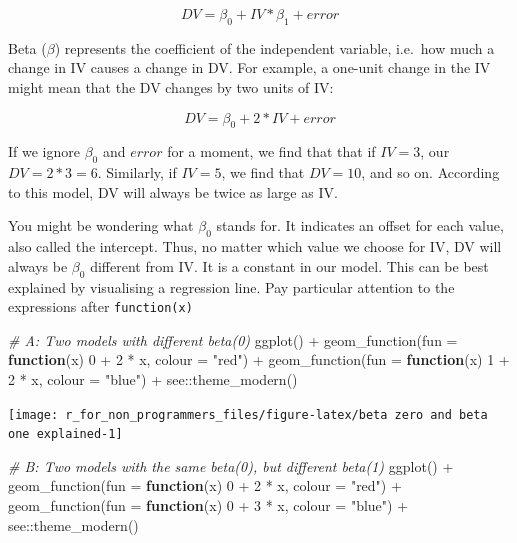 \documentclass[
]{book}
\newenvironment{Shaded}{\begin{snugshade}}{\end{snugshade}}
\newcommand{\AttributeTok}[1]{\textcolor[rgb]{0.77,0.63,0.00}{#1}}
\newcommand{\CommentTok}[1]{\textcolor[rgb]{0.56,0.35,0.01}{\textit{#1}}}
\newcommand{\ControlFlowTok}[1]{\textcolor[rgb]{0.13,0.29,0.53}{\textbf{#1}}}
\newcommand{\DecValTok}[1]{\textcolor[rgb]{0.00,0.00,0.81}{#1}}
\newcommand{\FunctionTok}[1]{\textcolor[rgb]{0.00,0.00,0.00}{#1}}
\newcommand{\NormalTok}[1]{#1}
\newcommand{\SpecialCharTok}[1]{\textcolor[rgb]{0.00,0.00,0.00}{#1}}
\newcommand{\StringTok}[1]{\textcolor[rgb]{0.31,0.60,0.02}{#1}}
\begin{document}
\[
DV = \beta_{0} + IV * \beta_{1} + error
\]

Beta (\(\beta\)) represents the coefficient of the independent variable, i.e.~how much a change in IV causes a change in DV. For example, a one-unit change in the IV might mean that the DV changes by two units of IV:

\leavevmode\hypertarget{single-linear-regression-example}{}%
\[
DV = \beta_0 + 2 * IV + error
\]

If we ignore \(\beta_0\) and \(error\) for a moment, we find that that if \(IV = 3\), our \(DV = 2*3 = 6\). Similarly, if \(IV = 5\), we find that \(DV = 10\), and so on. According to this model, DV will always be twice as large as IV.

You might be wondering what \(\beta_0\) stands for. It indicates an offset for each value, also called the intercept. Thus, no matter which value we choose for IV, DV will always be \(\beta_0\) different from IV. It is a constant in our model. This can be best explained by visualising a regression line. Pay particular attention to the expressions after \texttt{function(x)}

\begin{Shaded}
\begin{Highlighting}[]
\CommentTok{\# A: Two models with different beta(0)}
\FunctionTok{ggplot}\NormalTok{() }\SpecialCharTok{+}
  \FunctionTok{geom\_function}\NormalTok{(}\AttributeTok{fun =} \ControlFlowTok{function}\NormalTok{(x) }\DecValTok{0} \SpecialCharTok{+} \DecValTok{2} \SpecialCharTok{*}\NormalTok{ x, }\AttributeTok{colour =} \StringTok{"red"}\NormalTok{) }\SpecialCharTok{+}
  \FunctionTok{geom\_function}\NormalTok{(}\AttributeTok{fun =} \ControlFlowTok{function}\NormalTok{(x) }\DecValTok{1} \SpecialCharTok{+} \DecValTok{2} \SpecialCharTok{*}\NormalTok{ x, }\AttributeTok{colour =} \StringTok{"blue"}\NormalTok{) }\SpecialCharTok{+}
\NormalTok{  see}\SpecialCharTok{::}\FunctionTok{theme\_modern}\NormalTok{()}
\end{Highlighting}
\end{Shaded}

\begin{center}\texttt{[image: r\_for\_non\_programmers\_files/figure-latex/beta zero and beta one explained-1]} \end{center}

\begin{Shaded}
\begin{Highlighting}[]
\CommentTok{\# B: Two models with the same beta(0), but different beta(1)}
\FunctionTok{ggplot}\NormalTok{() }\SpecialCharTok{+}
  \FunctionTok{geom\_function}\NormalTok{(}\AttributeTok{fun =} \ControlFlowTok{function}\NormalTok{(x) }\DecValTok{0} \SpecialCharTok{+} \DecValTok{2} \SpecialCharTok{*}\NormalTok{ x, }\AttributeTok{colour =} \StringTok{"red"}\NormalTok{) }\SpecialCharTok{+}
  \FunctionTok{geom\_function}\NormalTok{(}\AttributeTok{fun =} \ControlFlowTok{function}\NormalTok{(x) }\DecValTok{0} \SpecialCharTok{+} \DecValTok{3} \SpecialCharTok{*}\NormalTok{ x, }\AttributeTok{colour =} \StringTok{"blue"}\NormalTok{) }\SpecialCharTok{+}
\NormalTok{  see}\SpecialCharTok{::}\FunctionTok{theme\_modern}\NormalTok{()}
\end{Highlighting}
\end{Shaded}
\end{document}
